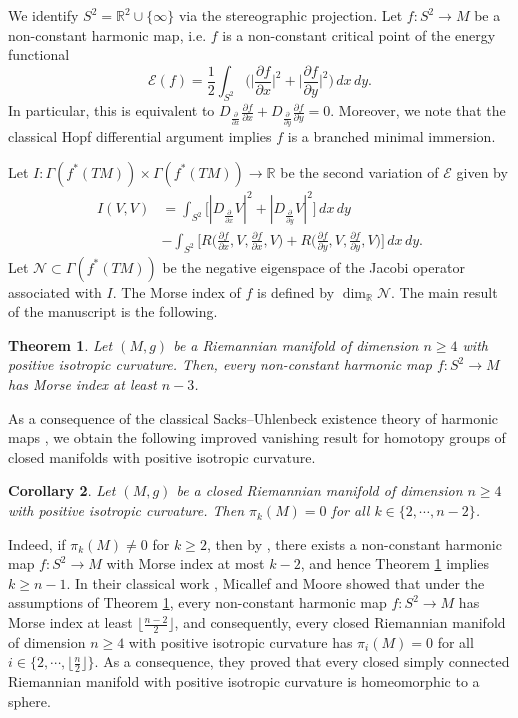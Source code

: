 \documentclass[11pt]{amsart}
\newtheorem{theorem}{Theorem}
\newtheorem{corollary}[theorem]{Corollary}
\theoremstyle{definition}
\begin{document}
We identify $S^2=\mathbb{R}^2\cup\{\infty\}$ via the stereographic projection. Let $f:S^2\to M$ be a non-constant harmonic map, i.e. $f$ is a non-constant critical point of the energy functional
\[
\mathscr{E}(f)=\frac{1}{2}\int_{S^2}\Big(\Big|\frac{\partial f}{\partial x}\Big|^2+\Big|\frac{\partial f}{\partial y}\Big|^2\Big)\,dx\,dy.
\]
In particular, this is equivalent to $D_{\frac{\partial}{\partial x}}\frac{\partial f}{\partial x}+D_{\frac{\partial}{\partial y}}\frac{\partial f}{\partial y}=0$. Moreover, we note that the classical Hopf differential argument implies $f$ is a branched minimal immersion.

Let $I:\Gamma(f^*(TM))\times \Gamma(f^*(TM))\to \mathbb{R}$ be the second variation of $\mathscr{E}$ given by
\begin{align*}
    I(V,V)&=\int_{S^2}\Big[|D_{\frac{\partial}{\partial x}}V|^2+|D_{\frac{\partial}{\partial y}}V|^2\Big]\,dx\,dy\\
    &-\int_{S^2}\Big[R\Big(\frac{\partial f}{\partial x},V,\frac{\partial f}{\partial x},V\Big)+R\Big(\frac{\partial f}{\partial y},V,\frac{\partial f}{\partial y},V\Big)\Big]\,dx\,dy.
\end{align*}
Let $\mathscr N\subset\Gamma(f^*(TM))$ be the negative eigenspace of the Jacobi
operator associated with $I$. The Morse index of $f$ is defined by $\dim_{\mathbb{R}}\mathscr N$. The main result of the manuscript is the following.
\begin{theorem}\label{thm}
    Let $(M,g)$ be a  Riemannian manifold of dimension $n\geq 4$ with positive isotropic curvature. Then, every non-constant harmonic map $f:S^2\to M$ has Morse index at least $n-3$. 
\end{theorem}
As a consequence of the classical Sacks--Uhlenbeck existence theory of harmonic maps \cite{SacksUhlenbeck1981}, we obtain the following improved vanishing result for homotopy groups of closed manifolds with positive isotropic curvature.
\begin{corollary}\label{cor:vanishing}
    Let $(M,g)$ be a closed Riemannian manifold of dimension $n\geq 4$ with positive isotropic curvature. Then $\pi_k(M)=0$ for all $k\in \{2,\cdots,n-2\}$.
\end{corollary}
Indeed, if $\pi_k(M)\neq0$ for $k\geq2$, then by \cite[Chapter VII, Theorem 2]{SchoenYau1997}, there exists a non-constant harmonic map $f:S^2\to M$ with Morse index at most $k-2$, and hence Theorem \ref{thm} implies $k\geq n-1$.
In their classical work \cite{MM1988}, Micallef and Moore showed that under the assumptions of Theorem \ref{thm}, every non-constant harmonic map $f:S^2\to M$ has Morse index at least $\lfloor\frac{n-2}{2}\rfloor$, and consequently, every closed Riemannian manifold of dimension $n\geq 4$ with positive isotropic curvature has $\pi_i(M)=0$ for all $i\in \{2,\cdots,\lfloor\frac{n}{2}\rfloor\}$. As a consequence, they proved that every closed simply connected Riemannian manifold with positive isotropic curvature is homeomorphic to a sphere.
\end{document}
